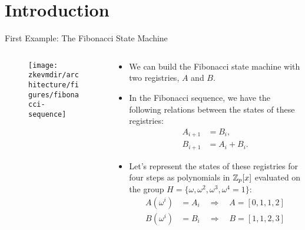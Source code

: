 
\section{Introduction}

\begin{frame}[allowframebreaks]{First Example: The Fibonacci State Machine}

\begin{columns}
\begin{column}{0.3\textwidth}
\begin{figure}
	\texttt{[image: \\zkevmdir/architecture/figures/fibonacci-sequence]}
\end{figure}
\end{column}
\begin{column}{0.7\textwidth}
\begin{itemize}
\item We can build the Fibonacci state machine with two registries, $A$ and $B$.
\item In the Fibonacci sequence, we have the following relations between the states of these registries:
\begin{align*}
A_{i+1} &= B_i, \\
B_{i+1} &= A_i + B_i.
\end{align*}

\item Let's represent the states of these registries for four steps as polynomials in $\mathbb{Z}_p[x]$ evaluated 
on the group $H = \{\omega, \omega^2, \omega^3, \omega^4 = 1\}$:
\begin{align*}
A(\omega^i) &= A_i \quad \Longrightarrow \quad A = [0, 1, 1, 2] \\
B(\omega^i) &= B_i \quad \Longrightarrow \quad B = [1, 1, 2, 3]
\end{align*}
\end{itemize}
\end{column}
\end{columns}



\end{frame}
